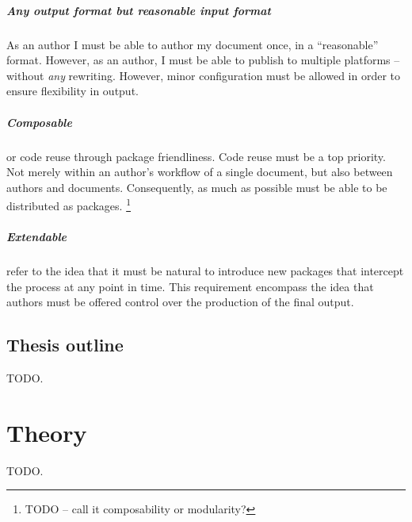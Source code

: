 \documentclass{scrreprt}
\begin{document}
\paragraph{Any output format but reasonable input format}
As an author I must be able to author my document once, in a ``reasonable'' format. However, as an author, I must be able to publish to multiple platforms -- without \emph{any} rewriting. However, minor configuration must be allowed in order to ensure flexibility in output.

\paragraph{Composable} or code reuse through package friendliness. Code reuse must be a top priority. Not merely within an author's workflow of a single document, but also between authors and documents. Consequently, as much as possible must be able to be distributed as packages. \footnote{TODO -- call it composability or modularity?}

\paragraph{Extendable} refer to the idea that it must be natural to introduce new packages that intercept the process at any point in time. This requirement encompass the idea that authors must be offered control over the production of the final output.




\section{Thesis outline}
TODO.



























%
%
%
%
%
%


\chapter{Theory}
\label{sec:theory}
TODO.
\end{document}
